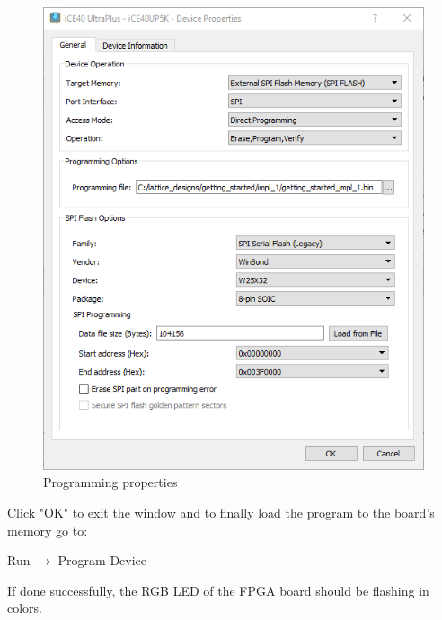 \documentclass[11pt, a4paper, oneside]{article}
\begin{document}
\begin{figure}[h!]
    \centering
    \includegraphics[scale=0.8]{figs/fig4.png}
    \caption{Programming properties}
    \label{fig4}
\end{figure}

Click "OK" to exit the window and to finally load the program to the board's memory go to:
\begin{center}
 Run $\rightarrow$ Program Device
\end{center}
If done successfully, the RGB LED of the FPGA board should be flashing in colors. 


\end{document}
